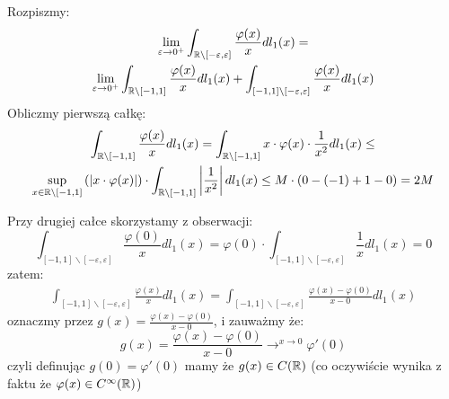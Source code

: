 \documentclass[11pt]{scrartcl}
\begin{document}
    \begin{walk}
        \item Rozpiszmy:
            \begin{gather*}
                \lim_{\varepsilon \to 0^+} \int_{\mathbb R \backslash [-\varepsilon, \varepsilon]} 
                    \frac{\varphi (x)}{x} dl_1 (x) = \\
                \lim_{\varepsilon \to 0^+} 
                    \int_{\mathbb R \backslash [-1,1]} \frac{\varphi (x)}{x} dl_1 (x) +
                    \int_{[-1,1] \backslash [-\varepsilon, \varepsilon]} \frac{\varphi (x)}{x} dl_1 (x)
            \end{gather*}
            Obliczmy pierwszą całkę:
            \begin{gather*}
                \int_{\mathbb R \backslash [-1,1]} \frac{\varphi (x)}{x} dl_1 (x) = 
                \int_{\mathbb R \backslash [-1,1]} x \cdot \varphi (x) \cdot \frac{1}{x^2} dl_1(x) \leq \\
                \sup_{x \in \mathbb R \backslash [-1, 1]} \left ( \left\lvert x \cdot \varphi (x) \right\rvert \right ) \cdot  
                    \int_{\mathbb R \backslash [-1,1]} \left\lvert \frac{1}{x^2} \right\rvert dl_1 (x) \leq
                M \cdot (0 - (-1) + 1 - 0) = 2M
            \end{gather*}
            
            Przy drugiej całce skorzystamy z obserwacji:
            \[
                \int_{[-1,1] \backslash [-\varepsilon, \varepsilon]} \frac{\varphi (0)}{x} dl_1 (x) =
                \varphi (0) \cdot \int_{[-1,1] \backslash [-\varepsilon, \varepsilon]} 
                    \frac{1}{x} dl_1 (x) = 0 
            \]
            zatem:
            \begin{gather*}
                \int_{[-1,1] \backslash [-\varepsilon, \varepsilon]} \frac{\varphi (x)}{x} dl_1 (x) =
                \int_{[-1,1] \backslash [-\varepsilon, \varepsilon]} 
                    \frac{\varphi (x) - \varphi (0)}{x - 0} dl_1 (x)
            \end{gather*}
            oznaczmy przez $g(x) = \frac{\varphi (x) - \varphi (0)}{x - 0}$, i zauważmy że:
            \[
                g(x) = \frac{\varphi (x) - \varphi (0)}{x - 0} \to^{x \to 0} \varphi' (0)
            \]
            czyli definując $g(0) = \varphi' (0)$ mamy że $g(x) \in C (\mathbb R)$ 
            (co oczywiście wynika z faktu że $\varphi (x) \in C^{\infty }(\mathbb R)$)


\end{walk}
\end{document}
